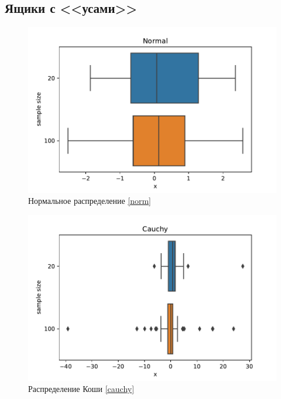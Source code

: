 \documentclass[a4paper]{article}
\begin{document}
\subsection{Ящики с <<усами>>}
\begin{figure}[H]
    \centering
    \includegraphics[width = 16 cm]{resources/NormalBox.pdf}
    \caption{Нормальное распределение \eqref{norm}}
    \label{fig:normBox}
\end{figure}
\begin{figure}[H]
    \centering
    \includegraphics[width = 16 cm]{resources/CauchyBox.pdf}
    \caption{Распределение Коши \eqref{cauchy}}
    \label{fig:cauchyBox}
\end{figure}
\end{document}
